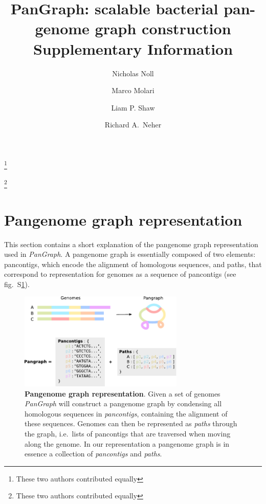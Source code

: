 \documentclass[aps,rmp,reprint,superscriptaddress,notitlepage,10pt,onecolumn]{revtex4-1}
\begin{document}
\title{PanGraph: scalable bacterial pan-genome graph construction \\ Supplementary Information}
\author{Nicholas Noll}
\thanks{These two authors contributed equally}
\author{Marco Molari}
\thanks{These two authors contributed equally}
\author{Liam P. Shaw}
\author{Richard A.~Neher}

\maketitle

\section{Pangenome graph representation}
\label{sec:graph-repr}

This section contains a short explanation of the pangenome graph representation used in \textit{PanGraph}. A pangenome graph is essentially composed of two elements: pancontigs, which encode the alignment of homologous sequences, and paths, that correspond to representation for genomes as a sequence of pancontigs (see fig.~S\ref{fig:graph-representation}).\\

\begin{figure}[tb]
    \includegraphics[width=0.7\textwidth]{figs_suppl/graph_representation.pdf}
    \caption{{\bf Pangenome graph representation}. Given a set of genomes \textit{PanGraph} will construct a pangenome graph by condensing all homologous sequences in \textit{pancontigs}, containing the alignment of these sequences. Genomes can then be represented as \textit{paths} through the graph, i.e.~lists of pancontigs that are traversed when moving along the genome.
    In our representation a pangenome graph is in essence a collection of \textit{pancontigs} and \textit{paths}.
    }
    \label{fig:graph-representation}
\end{figure}
\end{document}
